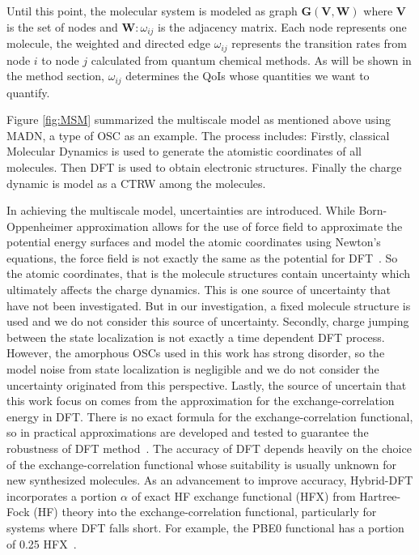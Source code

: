 \documentclass[%
 reprint,
 amsmath,amssymb,
 aps,
]{revtex4-2}
\begin{document}
Until this point, the molecular system is modeled as graph $\mathbf{G}(\mathbf{V}, \mathbf{W})$ where $\mathbf{V}$ is the set of nodes and $\mathbf{W}: \omega_{ij}$ is the adjacency matrix. Each node represents one molecule, the weighted and directed edge $\omega_{ij}$ represents the transition rates from node $i$ to node $j$ calculated from quantum chemical methods. 
As will be shown in the method section, $\omega_{ij}$ determines the QoIs whose quantities we want to quantify.

Figure \ref{fig:MSM} summarized the multiscale model as mentioned above using MADN, a type of OSC as an example. 
The process includes: Firstly, classical Molecular Dynamics is used to generate the atomistic coordinates of all molecules. Then DFT is used to obtain electronic structures. Finally the charge dynamic is model as a CTRW among the molecules.


In achieving the multiscale model, uncertainties are introduced. 
While Born-Oppenheimer approximation allows for the use of force field to approximate the potential energy surfaces and model the atomic coordinates using Newton’s equations, the force field is not exactly the same as the potential for DFT~\cite{izvekov_effective_2004}. 
So the atomic coordinates, that is the molecule structures contain uncertainty which ultimately affects the charge dynamics. 
This is one source of uncertainty that have not been investigated. But in our investigation, a fixed molecule structure is used and we do not consider this source of uncertainty. 
Secondly, charge jumping between the state localization is not exactly a time dependent DFT process. 
However, the amorphous OSCs used in this work has strong disorder, so the model noise from state localization is negligible and we do not consider the uncertainty originated from this perspective.
Lastly, the source of uncertain that this work focus on comes from the approximation for the exchange-correlation energy in DFT. 
There is no exact formula for the exchange-correlation functional, so in practical approximations are developed and tested to guarantee the robustness of DFT method~\cite{gunnarsson_exchange_1976, bilc_hybrid_2008, lee_development_1988}. 
The accuracy of DFT depends heavily on the choice of the exchange-correlation functional whose suitability is usually unknown for new synthesized molecules. 
As an advancement to improve accuracy, Hybrid-DFT \cite{marques_densitybased_2011,perdew_rationale_1996} incorporates a portion $\alpha$ of exact HF exchange functional (HFX) from Hartree-Fock (HF) theory into the exchange-correlation functional, particularly for systems where DFT falls short. For example, the PBE0 functional has a portion of 0.25 HFX~\cite{adamo_toward_1999}.
\end{document}
